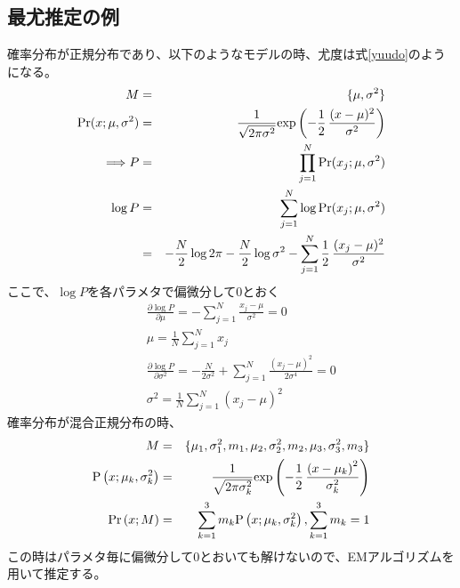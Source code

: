 \documentclass[dvipdfmx,titlepage, a4paper]{jsarticle}%
\begin{document}
\subsection{最尤推定の例}
確率分布が正規分布であり、以下のようなモデルの時、尤度は式\eqref{yuudo}のようになる。
\begin{eqnarray}
	M &=& \{\mu, \sigma^{2}\} \nonumber \\
	{\rm Pr}(x;\mu, \sigma^{2}) &=& \frac{1}{\sqrt{2 \pi \sigma^{2}}}{\rm exp}\left(-\frac{1}{2}\, \frac{(x - \mu)^{2}}{\sigma^{2}}\right) \nonumber\\
	\Longrightarrow 
	P &=& \prod_{j = 1}^{N}{\rm Pr}(x_{j};\mu, \sigma^{2}) \nonumber\\
	\log P &=& \sum_{j = 1}^{N}\log {\rm Pr}(x_{j};\mu, \sigma^{2}) \nonumber\\
		  &=& -\frac{N}{2}\log 2\pi - \frac{N}{2}\log \sigma^{2} - \sum_{j = 1}^{N}\frac{1}{2}\, \frac{(x_{j} - \mu)^{2}}{\sigma^{2}}\label{yuudo}
\end{eqnarray}
ここで、$\log P$を各パラメタで偏微分して0とおく
\begin{eqnarray*}
	&&\frac{\partial \log P}{\partial \mu} = - \sum_{j = 1}^{N}\frac{x_{j} - \mu}{\sigma^{2}} = 0\\
	&&\mu = \frac{1}{N}\sum_{j = 1}^{N}x_{j}\\
	&&\frac{\partial \log P}{\partial \sigma^{2}} = -\frac{N}{2\sigma^{2}} + \sum_{j = 1}^{N}\frac{(x_{j} - \mu)^{2}}{2\sigma^{4}} = 0\\
	&&\sigma^{2} = \frac{1}{N}\sum_{j = 1}^{N}(x_{j} - \mu)^{2}
\end{eqnarray*}
確率分布が混合正規分布の時、
\begin{eqnarray*}
	M &=& \{\mu_{1}, \sigma_{1}^{2}, m_{1}, \mu_{2}, \sigma_{2}^{2}, m_{2}, \mu_{3}, \sigma_{3}^{2}, m_{3}\}\\
	{\rm P}\left(x;\mu_{k}, \sigma_{k}^{2}\right) &=& \frac{1}{\sqrt{2 \pi \sigma_{k}^{2}}}{\rm exp}\left(-\frac{1}{2}\, \frac{\left(x - \mu_{k}\right)^{2}}{\sigma_{k}^{2}}\right)\\
	{\rm Pr}\left(x; M\right) &=& \sum_{k = 1}^{3}m_{k}{\rm P}\left(x;\mu_{k}, \sigma_{k}^{2}\right), \sum_{k = 1}^{3} m_{k} = 1
\end{eqnarray*}
この時はパラメタ毎に偏微分して0とおいても解けないので、EMアルゴリズムを用いて推定する。
\end{document}
